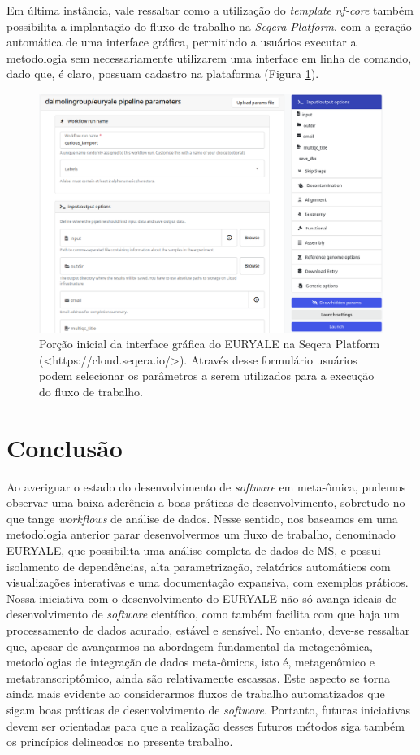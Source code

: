 \documentclass[
	12pt,				%
	oneside,			%
	a4paper,			%
	chapter=TITLE,		%
	section=TITLE,		%
	english,			%
	brazil				%
	]{abntex2}
\begin{document}
Em última instância, vale ressaltar como a utilização do \emph{template} \emph{nf-core} também possibilita a implantação do fluxo de trabalho na \emph{Seqera Platform}, com a geração automática de uma interface gráfica, permitindo a usuários executar a metodologia sem necessariamente utilizarem uma interface em linha de comando, dado que, é claro, possuam cadastro na plataforma (Figura \ref{fig:seqeraplat}).
\begin{figure}[H]

{\centering \includegraphics[width=0.7\linewidth]{figure/seqera_platform_example} 

}

\caption{Porção inicial da interface gráfica do EURYALE na Seqera Platform (<https://cloud.seqera.io/>). Através desse formulário usuários podem selecionar os parâmetros a serem utilizados para a execução do fluxo de trabalho.}\label{fig:seqeraplat}
\end{figure}
\chapter{Conclusão}\label{conclusuxe3o}

Ao averiguar o estado do desenvolvimento de \emph{software} em meta-ômica, pudemos observar
uma baixa aderência a boas práticas de desenvolvimento, sobretudo no que tange \emph{workflows}
de análise de dados. Nesse sentido, nos baseamos em uma metodologia anterior parar desenvolvermos um fluxo de trabalho, denominado EURYALE,
que possibilita uma análise completa de dados de \gls{MS}, e possui isolamento de dependências, alta parametrização, relatórios automáticos com visualizações interativas e uma documentação expansiva, com exemplos práticos.
Nossa iniciativa com o desenvolvimento do EURYALE não só avança ideais de desenvolvimento de \emph{software} científico, como também facilita com que haja um processamento de dados acurado, estável e sensível.
No entanto, deve-se ressaltar que, apesar de avançarmos na abordagem fundamental da metagenômica, metodologias de integração de dados
meta-ômicos, isto é, metagenômico e metatranscriptômico, ainda são relativamente escassas. Este aspecto se torna ainda mais evidente ao considerarmos fluxos de trabalho automatizados que sigam boas práticas de desenvolvimento de \emph{software}.
Portanto, futuras iniciativas devem ser orientadas para que a realização desses futuros métodos siga também os princípios delineados no presente trabalho.
\end{document}

